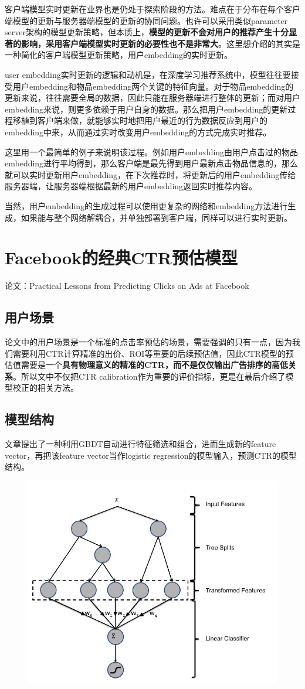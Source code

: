 \documentclass[12pt]{article}
\begin{document}
客户端模型实时更新在业界也是仍处于探索阶段的方法。难点在于分布在每个客户端模型的更新与服务器端模型的更新的协同问题。也许可以采用类似parameter server架构的模型更新策略，但本质上，\textbf{模型的更新不会对用户的推荐产生十分显著的影响，采用客户端模型实时更新的必要性也不是非常大}。这里想介绍的其实是一种简化的客户端模型更新策略，用户embedding的实时更新。

user embedding实时更新的逻辑和动机是，在深度学习推荐系统中，模型往往要接受用户embedding和物品embedding两个关键的特征向量。对于物品embedding的更新来说，往往需要全局的数据，因此只能在服务器端进行整体的更新；而对用户embedding来说，则更多依赖于用户自身的数据。那么把用户embedding的更新过程移植到客户端来做，就能够实时地把用户最近的行为数据反应到用户的embedding中来，从而通过实时改变用户embedding的方式完成实时推荐。

这里用一个最简单的例子来说明该过程。例如用户embedding由用户点击过的物品embedding进行平均得到，那么客户端是最先得到用户最新点击物品信息的，那么就可以实时更新用户embedding，在下次推荐时，将更新后的用户embedding传给服务器端，让服务器端根据最新的用户embedding返回实时推荐内容。

当然，用户embedding的生成过程可以使用更复杂的网络和embedding方法进行生成，如果能与整个网络解耦合，并单独部署到客户端，同样可以进行实时更新。

\section{Facebook的经典CTR预估模型}
论文：Practical Lessons from Predicting Clicks on Ads at Facebook

\subsection{用户场景}
论文中的用户场景是一个标准的点击率预估的场景，需要强调的只有一点，因为我们需要利用CTR计算精准的出价、ROI等重要的后续预估值，因此CTR模型的预估值需要是一个\textbf{具有物理意义的精准的CTR，而不是仅仅输出广告排序的高低关系}。所以文中不仅把CTR calibration作为重要的评价指标，更是在最后介绍了模型校正的相关方法。

\subsection{模型结构}
文章提出了一种利用GBDT自动进行特征筛选和组合，进而生成新的feature vector，再把该feature vector当作logistic regression的模型输入，预测CTR的模型结构。
\begin{figure}[H]
    \centering
    \includegraphics[width=.6\textwidth]{fig/Facebook_GBDT_LR_Feature.jpg}
\end{figure}
\end{document}
